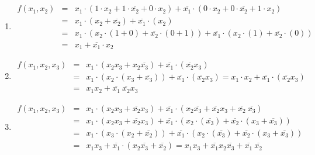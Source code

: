 \documentclass[DIN, pagenumber=false, fontsize=11pt, parskip=half]{scrartcl}
\begin{document}
    \subsection{}
    \begin{enumerate}[label=(\alph*)]
        \item
            \begin{eqnarray*}
                f(x_1, x_2) &=& x_1 \cdot (1 \cdot x_2 + 1 \cdot \overline{x_2} + 0 \cdot x_2)
                + \overline{x_1} \cdot (0 \cdot x_2 + 0 \cdot \overline{x_2} + 1 \cdot x_2) \\
                &=& x_1 \cdot (x_2 + \overline{x_2}) + \overline{x_1} \cdot (x_2) \\
                &=& x_1 \cdot (x_2 \cdot (1 + 0) + \overline{x_2} \cdot (0 + 1)) + \overline{x_1} \cdot (x_2 \cdot (1) + \overline{x_2} \cdot (0)) \\
                &=& x_1 + \overline{x_1} \cdot x_2 
            \end{eqnarray*}
        \item
            \begin{eqnarray*}
                f(x_1, x_2, x_3) &=& x_1 \cdot (x_2 x_3 + x_2 \overline{x_3}) + \overline{x_1} \cdot (\overline{x_2} x_3) \\
                &=& x_1 \cdot (x_2 \cdot (x_3 + \overline{x_3})) + \overline{x_1} \cdot (\overline{x_2} x_3) = x_1 \cdot x_2 + \overline{x_1} \cdot (\overline{x_2} x_3) \\
                &=& x_1 x_2 + \overline{x_1} \ \overline{x_2} x_3
            \end{eqnarray*}
        \item
            \begin{eqnarray*}
                f(x_1, x_2, x_3) &=& x_1 \cdot (x_2 x_3 + \overline{x_2} x_3) + \overline{x_1} \cdot (x_2 \overline{x_3} + \overline{x_2} x_3 + \overline{x_2} \ \overline{x_3}) \\
                &=& x_1 \cdot (x_2 x_3 + \overline{x_2} x_3) + \overline{x_1} \cdot (x_2 \cdot (\overline{x_3}) + \overline{x_2} \cdot (x_3 + \overline{x_3})) \\
                &=& x_1 \cdot (x_3 \cdot(x_2 + \overline{x_2})) + \overline{x_1} \cdot (x_2 \cdot (\overline{x_3}) + \overline{x_2} \cdot (x_3 + \overline{x_3})) \\
                &=& x_1 x_3 + \overline{x_1} \cdot (x_2 \overline{x_3} + \overline{x_2}) = x_1 x_3 + \overline{x_1} x_2 \overline{x_3} + \overline{x_1} \ \overline{x_2}
            \end{eqnarray*}
    \end{enumerate}
\end{document}
